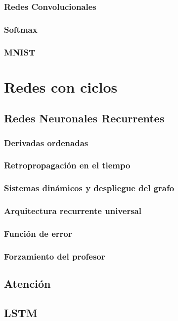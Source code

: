 \documentclass[12pt,openany]{book}
\begin{document}
\section{Redes Convolucionales}
\section{Softmax}
\section{MNIST}

\part{Redes con ciclos}
\chapter{Redes Neuronales Recurrentes}
\section{Derivadas ordenadas}
\section{Retropropagación en el tiempo}
\section{Sistemas dinámicos y despliegue del grafo}
\section{Arquitectura recurrente universal}
\section{Función de error}
\section{Forzamiento del profesor}

\chapter{Atención}
\chapter{LSTM}
\end{document}
